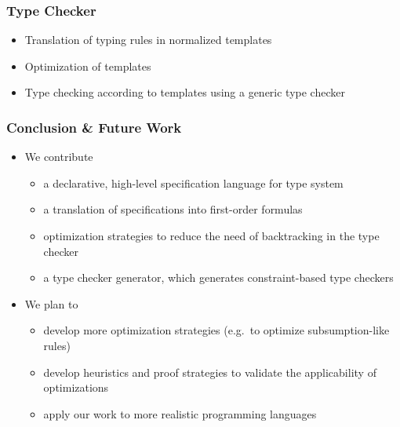 \documentclass{beamer}
\begin{document}
\begin{frame}
  \frametitle{Type Checker}
  \begin{itemize}
  \item Translation of typing rules in normalized templates
  \item Optimization of templates
  \item Type checking according to templates using a generic type
    checker
  \end{itemize}
\vspace{.5cm}
\end{frame}

\begin{frame}
  \frametitle{Conclusion \& Future Work}
  \begin{itemize}
  \item We contribute
    \begin{itemize}
    \item a declarative, high-level specification language for type
      system
    \item a translation of specifications into first-order formulas
    \item optimization strategies to reduce the need of backtracking
      in the type checker
    \item a type checker generator, which generates constraint-based
      type checkers
    \end{itemize}
  \item We plan to
    \begin{itemize}
    \item develop more optimization strategies (e.g.\ to optimize
      subsumption-like rules)
    \item develop heuristics and proof strategies to validate the
      applicability of optimizations
    \item apply our work to more realistic programming languages
    \end{itemize}
  \end{itemize}
\end{frame}
\end{document}
